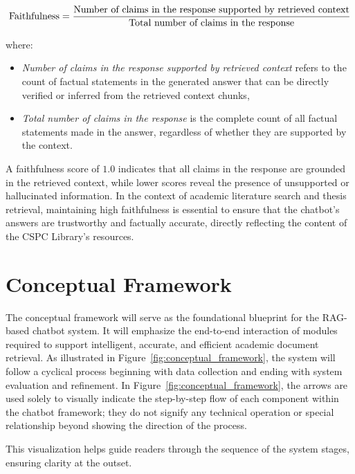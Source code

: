 \begin{refsection}
\begin{equation}
\centering
\text{Faithfulness} = \frac{\text{Number of claims in the response supported by retrieved context}}{\text{Total number of claims in the response}}
\end{equation}

where:
\begin{itemize}
\item \textit{Number of claims in the response supported by retrieved context} refers to the count of factual statements in the generated answer that can be directly verified or inferred from the retrieved context chunks,
\item \textit{Total number of claims in the response} is the complete count of all factual statements made in the answer, regardless of whether they are supported by the context.
\end{itemize}

A faithfulness score of $1.0$ indicates that all claims in the response are grounded in the retrieved context, while lower scores reveal the presence of unsupported or hallucinated information. In the context of academic literature search and thesis retrieval, maintaining high faithfulness is essential to ensure that the chatbot's answers are trustworthy and factually accurate, directly reflecting the content of the CSPC Library's resources.


\newpage
\clearpage
\section{Conceptual Framework}

The conceptual framework will serve as the foundational blueprint for the RAG-based chatbot system. It will emphasize the end-to-end interaction of modules required to support intelligent, accurate, and efficient academic document retrieval. As illustrated in Figure~\ref{fig:conceptual_framework}, the system will follow a cyclical process beginning with data collection and ending with system evaluation and refinement.
In Figure~\ref{fig:conceptual_framework}, the arrows are used solely to visually indicate the step-by-step flow of each component within the chatbot framework; they do not signify any technical operation or special relationship beyond showing the direction of the process. 

This visualization helps guide readers through the sequence of the system stages, ensuring clarity at the outset.


\end{refsection}
